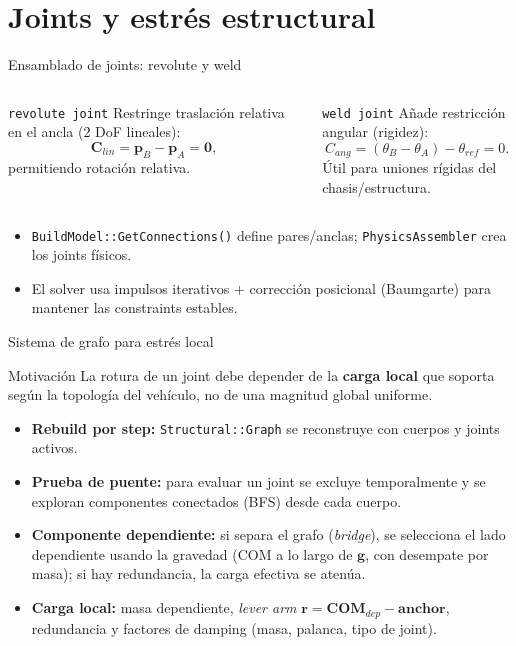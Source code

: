 \documentclass[aspectratio=169,11pt]{beamer}
\begin{document}
\section{Joints y estrés estructural}

\begin{frame}{Ensamblado de joints: revolute y weld}
  \begin{columns}[T]
    \begin{block}{\texttt{revolute joint}}
      Restringe traslación relativa en el ancla (2 DoF lineales):
      \[
        \mathbf{C}_{lin} = \mathbf{p}_B - \mathbf{p}_A = \mathbf{0},
      \]
      permitiendo rotación relativa.
    \end{block}
    \begin{block}{\texttt{weld joint}}
      Añade restricción angular (rigidez):
      \[
        C_{ang} = (\theta_B - \theta_A) - \theta_{ref} = 0.
      \]
      Útil para uniones rígidas del chasis/estructura.
    \end{block}
  \end{columns}

  \vspace{0.15cm}
  \begin{itemize}
    \item \texttt{BuildModel::GetConnections()} define pares/anclas; \texttt{PhysicsAssembler} crea los joints físicos.
    \item El solver usa impulsos iterativos + corrección posicional (Baumgarte) para mantener las constraints estables.
  \end{itemize}
\end{frame}

\begin{frame}{Sistema de grafo para estrés local}
  \begin{block}{Motivación}
    La rotura de un joint debe depender de la \textbf{carga local} que soporta según la topología del vehículo, no de una magnitud global uniforme.
  \end{block}

  \begin{itemize}
    \item \textbf{Rebuild por step:} \texttt{Structural::Graph} se reconstruye con cuerpos y joints activos.
    \item \textbf{Prueba de puente:} para evaluar un joint se excluye temporalmente y se exploran componentes conectados (BFS) desde cada cuerpo.
    \item \textbf{Componente dependiente:} si separa el grafo (\emph{bridge}), se selecciona el lado dependiente usando la gravedad (COM a lo largo de $\mathbf{g}$, con desempate por masa); si hay redundancia, la carga efectiva se atenúa.
    \item \textbf{Carga local:} masa dependiente, \emph{lever arm} $\mathbf{r}=\mathbf{COM}_{dep}-\mathbf{anchor}$, redundancia y factores de damping (masa, palanca, tipo de joint).
  \end{itemize}
\end{frame}
\end{document}
